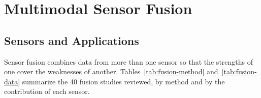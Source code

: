 \section{Multimodal Sensor Fusion}
\label{sec:lr-fusion}

\subsection{Sensors and Applications}

Sensor fusion combines data from more than one sensor so that the strengths of
one cover the weaknesses of another. Tables~\ref{tab:fusion-method}
and~\ref{tab:fusion-data} summarize the 40 fusion studies reviewed, by method and
by the contribution of each sensor.

